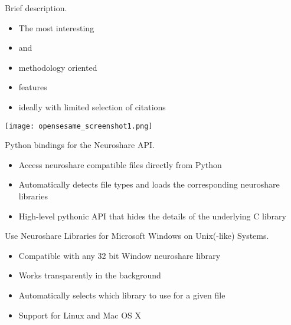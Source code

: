 \begin{multicols}{3}
Brief description.
\begin{itemize}[nolistsep,topsep=0em,leftmargin=1pc]
\item The most interesting
\item and
\item methodology oriented
\item features
\item ideally with limited selection of citations
\end{itemize}
\texttt{[image: opensesame\_screenshot1.png]}



Python bindings for the Neuroshare API.

\begin{itemize}[nolistsep,topsep=0em,leftmargin=1pc]
\item Access neuroshare compatible files directly from Python
\item Automatically detects file types and loads the corresponding neuroshare libraries
\item High-level pythonic API that hides the details of the underlying C library
\end{itemize}



Use Neuroshare Libraries for Microsoft Windows on Unix(-like) Systems.

\begin{itemize}[nolistsep,topsep=0em,leftmargin=1pc]
\item Compatible with any 32 bit Window neuroshare library
\item Works transparently in the background
\item Automatically selects which library to use for a given file
\item Support for Linux and Mac OS X
\end{itemize}




\end{multicols}
